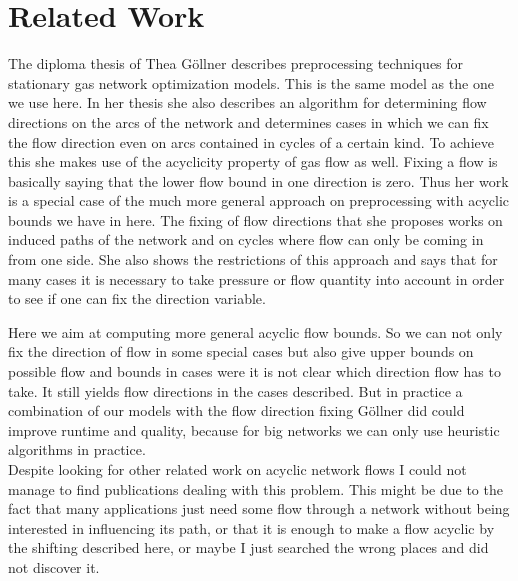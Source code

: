 \section{Related Work}
The diploma thesis of Thea Göllner \cite{DiplomarbeitTheaGoellner} describes preprocessing techniques for stationary gas 
network optimization models. This is the same model as the one we use here. In her thesis she also describes an 
algorithm for determining flow directions on the arcs of the network and determines cases in which we can fix the flow 
direction even on arcs contained in cycles of a certain kind. To achieve this she makes use of the acyclicity property 
of gas flow as well. 
Fixing a flow is basically saying that the lower flow bound in one direction is zero. Thus her work is a special case 
of the much more general approach on preprocessing with acyclic bounds we have in here. The fixing of flow directions 
that she proposes works on induced paths of the network and on cycles where flow can only be coming in from one side. 
She also shows the restrictions of this approach and says that for many cases it is necessary to take pressure or flow 
quantity into account in order to see if one can fix the direction variable. 

Here we aim at computing more general acyclic flow bounds. So we can not only fix the direction of flow in some special 
cases but also give upper bounds on possible flow and bounds in cases were it is not clear which direction flow has to 
take. It still yields flow directions in the cases described. But in practice a combination of our models with the 
flow direction fixing Göllner did could improve runtime and quality, because for big networks we can only use heuristic 
algorithms in practice.\\

Despite looking for other related work on acyclic network flows I could not manage to find publications dealing with this 
problem. This might be due to the fact that many applications just need some flow through a network without being 
interested in influencing its path, or that it is enough to make a flow acyclic by the shifting described here, or maybe
 I just searched the wrong places and did not discover it. 
